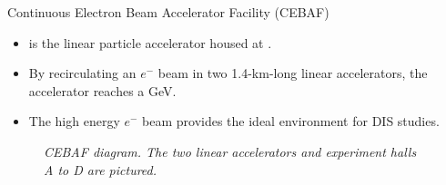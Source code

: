\begin{frame}{Continuous Electron Beam Accelerator Facility (CEBAF)}
    \label{10.31::cebaf}

    \begin{itemize}
        \item
             is the linear particle accelerator housed at .

        \item
            By recirculating an $e^-$ beam in two 1.4-km-long linear accelerators, the accelerator reaches a  \textcolor{efd_green}{GeV}.

        \item
            The high energy $e^-$ beam provides the ideal environment for DIS studies.
    \end{itemize}

    \begin{center}
        \begin{figure}[t]

            \scriptsize{\textit{
                CEBAF diagram.
                The two linear accelerators and experiment halls A to D are pictured.
            }}
        \end{figure}
    \end{center}
\end{frame}

